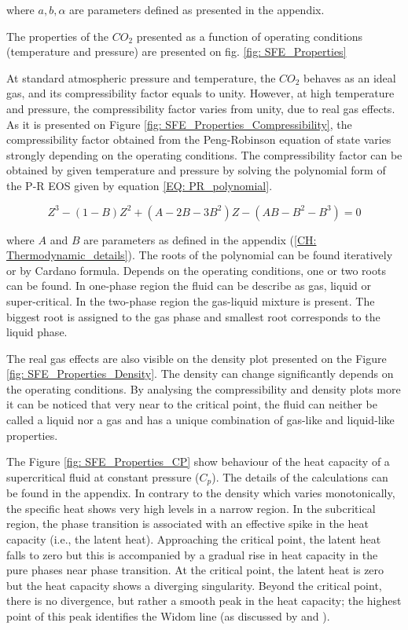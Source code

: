 \documentclass[../Article_Model_Parameters.tex]{subfiles}
\begin{document}
    where $a, b, \alpha$ are parameters defined as presented in the appendix.
    
    The properties of the $CO_2$ presented as a function of operating conditions (temperature and pressure) are presented on fig. \ref{fig: SFE_Properties}    
    
    At standard atmospheric pressure and temperature, the $CO_2$ behaves as an ideal gas, and its compressibility factor equals to unity.  However, at high temperature and pressure, the compressibility factor varies from unity, due to real gas effects. As it is presented on Figure \ref{fig: SFE_Properties_Compressibility}, the compressibility factor obtained from the Peng-Robinson equation of state varies strongly depending on the operating conditions. The compressibility factor can be obtained by given temperature and pressure by solving the polynomial form of the P-R EOS given by equation \ref{EQ: PR_polynomial}.

    {\footnotesize
    \begin{equation}
        Z^3 - (1-B)Z^2+(A-2B-3B^2)Z -(AB-B^2-B^3) = 0
        \label{EQ: PR_polynomial}
    \end{equation}
    }

    where $A$ and $B$ are parameters as defined in the appendix (\ref{CH: Thermodynamic_details}). The roots of the polynomial can be found iteratively or by Cardano formula. Depends on the operating conditions, one or two roots can be found. In one-phase region the fluid can be describe as gas, liquid or super-critical. In the two-phase region the gas-liquid mixture is present. The biggest root is assigned to the gas phase and smallest root corresponds to the liquid phase.

    The real gas effects are also visible on the density plot presented on the Figure \ref{fig: SFE_Properties_Density}. The density can change significantly depends on the operating conditions. 
    By analysing the compressibility and density plots more it can be noticed that very near to the critical point, the fluid can neither be called a liquid nor a gas and has a unique combination of gas-like and liquid-like properties. 

    The Figure \ref{fig: SFE_Properties_CP} show behaviour of the heat capacity of a supercritical fluid at constant pressure ($C_p$). The details of the calculations can be found in the appendix. In contrary to the density which varies monotonically, the specific heat shows very high levels in a narrow region. In the subcritical region, the phase transition is associated with an effective spike in the heat capacity (i.e., the latent heat). Approaching the critical point, the latent heat falls to zero but this is accompanied by a gradual rise in heat capacity in the pure phases near phase transition. At the critical point, the latent heat is zero but the heat capacity shows a diverging singularity. Beyond the critical point, there is no divergence, but rather a smooth peak in the heat capacity; the highest point of this peak identifies the Widom line (as discussed by \citet{Simeoni2010} and \citet{Banuti2019}).
\end{document}
